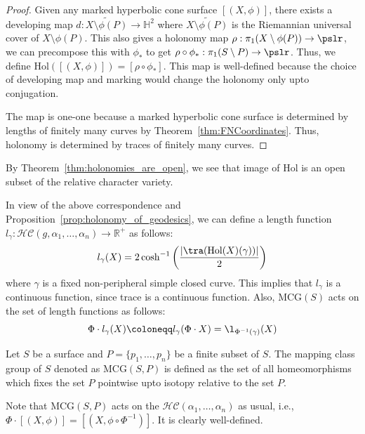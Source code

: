 \begin{proof}
	Given any marked hyperbolic cone surface $[(X,\phi)]$, there exists a developing map $d: \widetilde{X \setminus \phi(P)} \rightarrow \mathbb{H}^2 $ where $\widetilde{X \setminus \phi(P)}$ is the Riemannian universal cover of $X \setminus \phi(P)$. This also gives a holonomy map $\rho: \pi_1(X \setminus \phi(P)) \rightarrow \pslr$, we can precompose this with $\phi_\ast$ to get $\rho \circ \phi_\ast: \pi_1(S \setminus P) \rightarrow \pslr$. Thus, we define $\text{Hol}\left([(X,\phi)]\right) = [\rho \circ \phi_\ast]$. This map is well-defined because the choice of developing map and marking would change the holonomy only upto conjugation.
	
	The map is one-one because a marked hyperbolic cone surface is determined by lengths of finitely many curves by Theorem~\ref{thm:FNCoordinates}. Thus, holonomy is determined by traces of finitely many curves. 
	
\end{proof}
\begin{remark} \label{rem:openness_of_holonomies}
	By Theorem~\ref{thm:holonomies_are_open}, we see that image of $\text{Hol}$ is an open subset of the relative character variety.
\end{remark}
In view of the above correspondence and Proposition~\ref{prop:holonomy_of_geodesics}, we can define a length function $l_\gamma: \mathcal{HC}(g,\alpha_1,\ldots,\alpha_n) \rightarrow \mathbb{R}^+ $ as follows:
\[l_\gamma(X) = 2 \cosh^{-1}\left(\frac{|\tra(\text{Hol}(X)(\gamma))|}{2}\right)\]
where $\gamma$ is a fixed non-peripheral simple closed curve. This implies that $l_\gamma$ is a continuous function, since trace is a continuous function. Also, $\text{MCG}(S)$ acts on the set of length functions as follows: 
\[\Phi \cdot l_\gamma (X) \coloneqq l_\gamma (\Phi \cdot X) = \l_{\Phi^{-1}(\gamma)} (X)\]
 
\begin{defn}
 	Let $S$ be a surface and $P = \{p_1,\ldots,p_n\}$ be a finite subset of $S$. The mapping class group of $S$ denoted as $\text{MCG}(S,P)$ is defined as the set of all homeomorphisms which fixes the set $P$ pointwise upto isotopy relative to the set $P$.
\end{defn}

Note that $\text{MCG}(S,P)$ acts on the $\mathcal{HC}(\alpha_1,\ldots, \alpha_n)$ as usual, i.e., $\Phi \cdot \left[(X,\phi)\right] = \left[ (X, \phi \circ \Phi^{-1}) \right]$. It is clearly well-defined.

